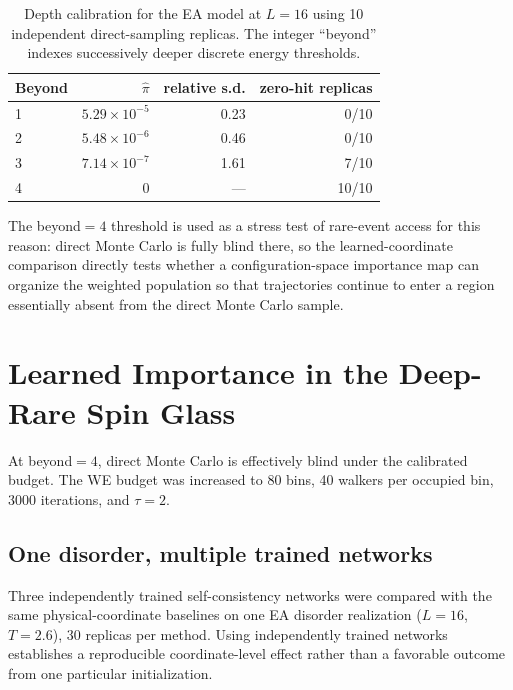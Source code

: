 \documentclass[a4paper,fleqn]{cas-sc}
\begin{document}
\begin{table}[H]
\centering\small
\caption{Depth calibration for the EA model at $L=16$ using 10 independent direct-sampling
replicas. The integer ``beyond'' indexes successively deeper discrete energy thresholds.}
\label{tab:depth}
\begin{tabular}{lrrr}
\toprule
Beyond & $\hat\pi$ & relative s.d. & zero-hit replicas \\
\midrule
1 & $5.29\times10^{-5}$ & 0.23 & 0/10 \\
2 & $5.48\times10^{-6}$ & 0.46 & 0/10 \\
3 & $7.14\times10^{-7}$ & 1.61 & 7/10 \\
4 & $0$ & --- & 10/10 \\
\bottomrule
\end{tabular}
\end{table}

The beyond$=4$ threshold is used as a stress test of rare-event access for this reason: direct
Monte Carlo is fully blind there, so the learned-coordinate comparison directly tests whether a
configuration-space importance map can organize the weighted population so that trajectories
continue to enter a region essentially absent from the direct Monte Carlo sample.

\FloatBarrier

\section{Learned Importance in the Deep-Rare Spin Glass}\label{sec:deep}

At beyond$=4$, direct Monte Carlo is effectively blind under the calibrated budget. The WE
budget was increased to 80 bins, 40 walkers per occupied bin, 3000 iterations, and $\tau=2$.

\subsection{One disorder, multiple trained networks}\label{sec:deepwithin}
Three independently trained self-consistency networks were compared with the same
physical-coordinate baselines on one EA disorder realization ($L=16$, $T=2.6$), $30$ replicas
per method. Using independently trained networks establishes a reproducible coordinate-level
effect rather than a favorable outcome from one particular initialization.
\end{document}
